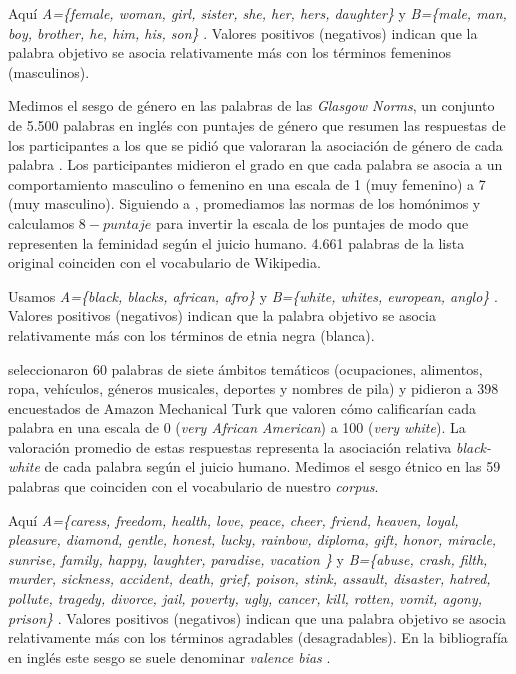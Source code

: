 \begin{description}[leftmargin=\parindent,labelindent=\parindent]

    \item[Sesgo de género.] Aquí \emph{A=\{female, woman, girl, sister, she, her, hers, daughter\}} y \emph{B=\{male, man, boy, brother, he, him, his, son\}} \citep{caliskan2017semantics}. Valores positivos (negativos) indican que la palabra objetivo se asocia relativamente más con los términos femeninos (masculinos). 

    Medimos el sesgo de género en las palabras de las \emph{Glasgow Norms}, un conjunto de 5.500 palabras en inglés con puntajes de género que resumen las respuestas de los participantes a los que se pidió que valoraran la asociación de género de cada palabra \citep{scott2019glasgow}. Los participantes midieron el grado en que cada palabra se asocia a un comportamiento masculino o femenino en una escala de 1 (muy femenino) a 7 (muy masculino). Siguiendo a \citet{lewis2020gender}, promediamos las normas de los homónimos y calculamos $8 - puntaje$ para invertir la escala de los puntajes de modo que representen la feminidad según el juicio humano. 4.661 palabras de la lista original coinciden con el vocabulario de Wikipedia.

    \item[Sesgo étnico.] Usamos \emph{A=\{black, blacks, african, afro\}} y \emph{B=\{white, whites, european, anglo\}} \citep{kozlowski2019geometry}. Valores positivos (negativos) indican que la palabra objetivo se asocia relativamente más con los términos de etnia negra (blanca). 

    \citet{kozlowski2019geometry} seleccionaron 60 palabras de siete ámbitos temáticos (ocupaciones, alimentos, ropa, vehículos, géneros musicales, deportes y nombres de pila) y pidieron a 398 encuestados de Amazon Mechanical Turk que valoren cómo calificarían cada palabra en una escala de 0 (\emph{very African American}) a 100 (\emph{very white}). La valoración promedio de estas respuestas representa la asociación relativa \emph{black-white} de cada palabra según el juicio humano. Medimos el sesgo étnico en las 59 palabras que coinciden con el vocabulario de nuestro \emph{corpus}.

    \item[Sesgo de sentimiento.] Aquí 
    \emph{A=\{caress, freedom, health, love, peace, cheer, friend, heaven, loyal, pleasure, diamond, gentle, honest, lucky, rainbow, diploma, gift, honor, miracle, sunrise, family, happy, laughter, paradise, vacation
    \}} 
    y 
    \emph{B=\{abuse, crash, filth, murder, sickness, accident, death, grief, poison, stink, assault, disaster, hatred, pollute, tragedy, divorce, jail, poverty, ugly, cancer, kill, rotten, vomit, agony, prison\}} 
    \citep{caliskan2017semantics}. Valores positivos (negativos) indican que una palabra objetivo se asocia relativamente más con los términos agradables (desagradables). En la bibliografía en inglés este sesgo se suele denominar \emph{valence bias} \citep{toney2021valnorm}.


\end{description}
